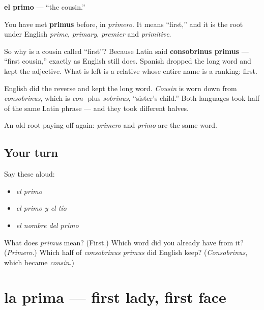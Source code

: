 \begin{cousinweb}
\textbf{el primo} --- \textquotedblleft{}the cousin.\textquotedblright{}

You have met \textbf{primus} before, in \emph{primero}. It means \textquotedblleft{}first,\textquotedblright{} and it is the root under English \emph{prime}, \emph{primary}, \emph{premier} and \emph{primitive}.

So why is a cousin called \textquotedblleft{}first\textquotedblright{}? Because Latin said \textbf{consobrinus primus} --- \textquotedblleft{}first cousin,\textquotedblright{} exactly as English still does. Spanish dropped the long word and kept the adjective. What is left is a relative whose entire name is a ranking: first.

English did the reverse and kept the long word. \emph{Cousin} is worn down from \emph{consobrinus}, which is \emph{con-} plus \emph{sobrinus}, \textquotedblleft{}sister's child.\textquotedblright{} Both languages took half of the same Latin phrase --- and they took different halves.
\end{cousinweb}

\begin{grammarlens}[title={What you've built}]
An old root paying off again: \emph{primero} and \emph{primo} are the same word.
\end{grammarlens}

\subsection*{Your turn}
Say these aloud:

\begin{itemize}
\raggedright
  \item \emph{el primo}
  \item \emph{el primo y el tío}
  \item \emph{el nombre del primo}
\end{itemize}

\begin{tcolorbox}[breakable,colback=teal!4,colframe=teal!35!black,title={Before you move on}]
What does \emph{primus} mean? (First.) Which word did you already have from it? (\emph{Primero}.) Which half of \emph{consobrinus primus} did English keep? (\emph{Consobrinus}, which became \emph{cousin}.)
\end{tcolorbox}
\section[la prima]{la prima --- first lady, first face}

